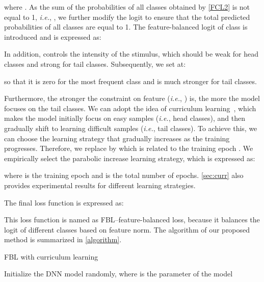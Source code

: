 \documentclass{article}
\def\ie{\emph{i.e.}} \def\Ie{\emph{I.e}\onedot}
\begin{document}
where . As the sum of the probabilities of all classes obtained by \cref{FCL2} is not equal to 1, \ie, , we further modify the logit to ensure that the total predicted probabilities of all classes are equal to 1. The feature-balanced logit  of class  is introduced and is expressed as:

In addition,  controls the intensity of the stimulus, which should be weak for head classes and strong for tail classes. Subsequently, we set  at:

so that it is zero for the most frequent class and is much stronger for tail classes.

Furthermore, the stronger the constraint on feature (\ie, ) is, the more the model focuses on the tail classes. We can adopt the idea of curriculum learning~\cite{bengio2009curriculum}, which makes the model initially focus on easy samples (\ie, head classes), and then gradually shift to learning difficult samples (\ie, tail classes). To achieve this, we can choose the learning strategy that gradually increases  as the training progresses. Therefore, we replace  by  which is related to the training epoch . We empirically select the parabolic increase learning strategy, which is expressed as:

where  is the training epoch and  is the total number of epochs. \cref{sec:curr} also provides experimental results for different learning strategies.

The final loss function  is expressed as:

This loss function is named as FBL--feature-balanced loss, because it balances the logit of different classes based on feature norm. The algorithm of our proposed method is summarized in \cref{algorithm}.

\begin{algorithm}[t]
\caption{FBL with curriculum learning}\label{algorithm}
\SetAlgoLined
{}
Initialize the DNN model  randomly, where  is the parameter of the model\;
\end{algorithm}
\end{document}
